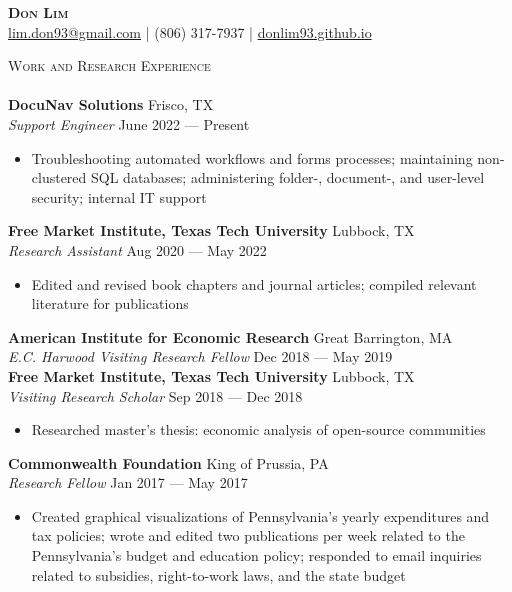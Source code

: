 \documentclass[a4paper,11pt]{article}
\newcommand{\lineunder} {
    \vspace*{-8pt} \\
    \hspace*{-18pt} \hrulefill \\
}
\newcommand{\header} [1] {
    {\hspace*{-18pt}\vspace*{6pt} \textsc{\large{#1}}}
    \vspace*{-6pt} \lineunder
}
\begin{document}
\vspace*{-40pt}
\fontsize{10.5}{12}\selectfont

\vspace*{-10pt}
\begin{center}
    {\Huge\textbf\textsc{{{Don Lim}}}}\\
    \href{mailto:lim.don93@gmail.com}{lim.don93@gmail.com} | (806) 317-7937 | \href{https://donlim93.github.io/}{donlim93.github.io} \\
\end{center}
\header{Work and Research Experience}
\textbf{DocuNav Solutions} \hfill Frisco, TX \\
\textit{Support Engineer} \hfill June 2022 --- Present \\
\begin{itemize}
    \item Troubleshooting automated workflows and forms processes; maintaining non-clustered SQL databases; administering folder-, document-, and user-level security; internal IT support
\end{itemize}    

\textbf{Free Market Institute, Texas Tech University} \hfill Lubbock, TX\\
\textit{Research Assistant} \hfill Aug 2020 --- May 2022 \\
\begin{itemize}
    \item Edited and revised book chapters and journal articles; compiled relevant literature for publications
\end{itemize}

\textbf{American Institute for Economic Research} \hfill Great Barrington, MA\\
\textit{E.C. Harwood Visiting Research Fellow} \hfill Dec 2018 --- May 2019\\

\textbf{Free Market Institute, Texas Tech University} \hfill Lubbock, TX\\
\textit{Visiting Research Scholar} \hfill Sep 2018 --- Dec 2018\\
\begin{itemize}
    \item Researched master's thesis: economic analysis of open-source communities
\end{itemize}

\textbf{Commonwealth Foundation} \hfill King of Prussia, PA\\
\textit{Research Fellow} \hfill Jan 2017 --- May 2017\\
\begin{itemize}
    \item Created graphical visualizations of Pennsylvania's yearly expenditures and tax policies; wrote and edited two publications per week related to the Pennsylvania's budget and education policy; responded to email inquiries related to subsidies, right-to-work laws, and the state budget
\end{itemize}
\end{document}
